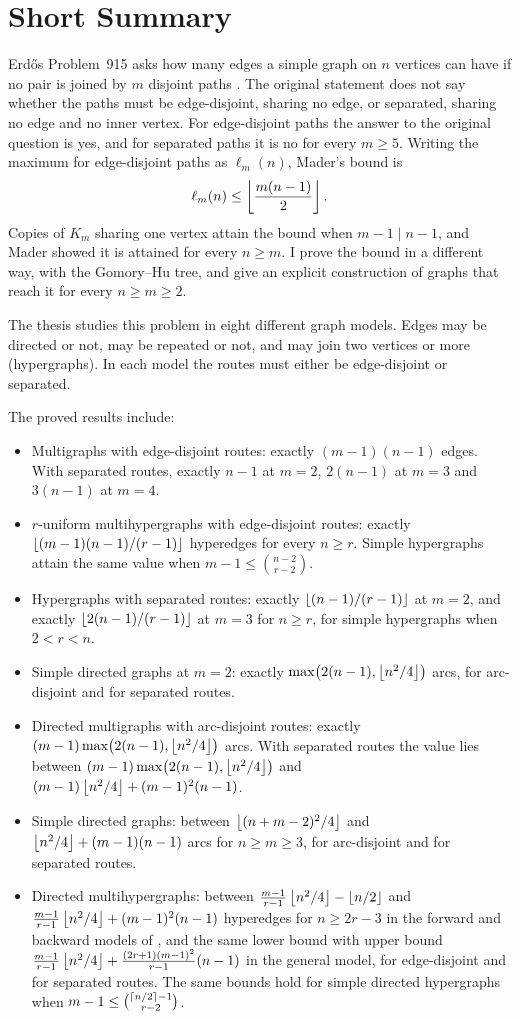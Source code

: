 \chapter*{Short Summary}
Erd\H{o}s Problem~915 asks how many edges a simple graph on $n$ vertices can
have if no pair is joined by $m$ disjoint paths
\cite{BollobasErdos62,ErdosProblems}. The original statement does not say whether
the paths must be edge-disjoint, sharing no edge, or separated, sharing no edge
and no inner vertex. For edge-disjoint paths the answer
to the original question is yes, and for separated paths it is no for every
$m\ge5$. Writing the maximum for edge-disjoint paths as $\ell_m(n)$,
Mader's bound is
\[
 \ell_m(n)\le\left\lfloor \frac{m(n-1)}{2} \right\rfloor.
\]
Copies of $K_m$ sharing one vertex attain the bound when $m-1 \mid n-1$, and Mader showed it is attained for every $n\ge m$. I prove the bound in a different way, with the Gomory--Hu tree, and give an explicit construction of graphs that reach it for every $n\ge m\ge2$.

The thesis studies this problem in eight different graph models. Edges may be directed or not, may be repeated or not, and may join two vertices or more (hypergraphs). In each model the routes must either be edge-disjoint or separated.

The proved results include:
\begin{itemize}
\item Multigraphs with edge-disjoint routes: exactly $(m-1)(n-1)$ edges. With separated routes, exactly $n-1$ at $m=2$, $2(n-1)$ at $m=3$ and $3(n-1)$ at $m=4$.
\item $r$-uniform multihypergraphs with edge-disjoint routes: exactly $\left\lfloor (m-1)(n-1)/(r-1) \right\rfloor$ hyperedges for every $n\ge r$. Simple hypergraphs attain the same value when $m-1\le\binom{n-2}{r-2}$.
\item Hypergraphs with separated routes: exactly $\left\lfloor (n-1)/(r-1) \right\rfloor$ at $m=2$, and exactly $\left\lfloor 2(n-1)/(r-1) \right\rfloor$ at $m=3$ for $n\ge r$, for simple hypergraphs when $2<r<n$.
\item Simple directed graphs at $m=2$: exactly $\max\bigl(2(n-1),\left\lfloor n^2/4 \right\rfloor\bigr)$ arcs, for arc-disjoint and for separated routes.
\item Directed multigraphs with arc-disjoint routes: exactly $(m-1)\max\bigl(2(n-1),\left\lfloor n^2/4 \right\rfloor\bigr)$ arcs. With separated routes the value lies between $(m-1)\max\bigl(2(n-1),\left\lfloor n^2/4 \right\rfloor\bigr)$ and $(m-1)\left\lfloor n^2/4 \right\rfloor+(m-1)^2(n-1)$.
\item Simple directed graphs: between $\left\lfloor (n+m-2)^2/4 \right\rfloor$ and $\left\lfloor n^2/4 \right\rfloor+(m-1)(n-1)$ arcs for $n\ge m\ge3$, for arc-disjoint and for separated routes.
\item Directed multihypergraphs: between $\frac{m-1}{r-1}\left\lfloor n^2/4 \right\rfloor-\left\lfloor n/2 \right\rfloor$ and $\frac{m-1}{r-1}\left\lfloor n^2/4 \right\rfloor+(m-1)^2(n-1)$ hyperedges for $n\ge2r-3$ in the forward and backward models of , and the same lower bound with upper bound $\frac{m-1}{r-1}\left\lfloor n^2/4 \right\rfloor+\frac{(2r+1)(m-1)^2}{r-1}(n-1)$ in the general model, for edge-disjoint and for separated routes. The same bounds hold for simple directed hypergraphs when $m-1\le\binom{\left\lceil n/2 \right\rceil-1}{r-2}$.
\end{itemize}

